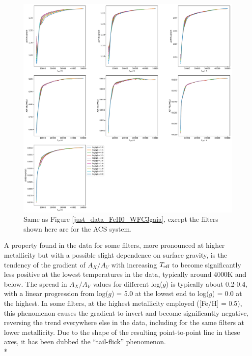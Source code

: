 \documentclass[12pt, a4paper]{report}
\begin{document}
\begin{figure}[h]
\begin{center}
\includegraphics[scale=0.4]{../just_full_data/ACS/AHub_FeH0p0_just_Teff_plot_lines.pdf}
\caption{Same as Figure \ref{just_data_FeH0_WFC3gaia}, except the filters shown here are for the ACS system.}
\label{just_data_FeH0_ACS}
\end{center}
\end{figure}

A property found in the data for some filters, more pronounced at higher metallicity but with a possible slight dependence on surface gravity, is the tendency of the gradient of $A_{X}/A_{V}$ with increasing $T_{\textnormal{eff}}$ to become significantly less positive at the lowest temperatures in the data, typically around 4000K and below. The spread in $A_{X}/A_{V}$ values for different log($g$) is typically about 0.2-0.4, with a linear progression from log($g$) = 5.0 at the lowest end to log($g$) = 0.0 at the highest. In some filters, at the highest metallicity employed ([Fe/H] = 0.5), this phenomenon causes the gradient to invert and become significantly negative, reversing the trend everywhere else in the data, including for the same filters at lower metallicity. Due to the shape of the resulting point-to-point line in these axes, it has been dubbed the ``tail-flick'' phenomenon.\\*
\end{document}
